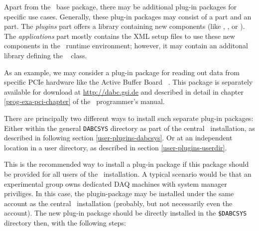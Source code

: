 

Apart from the \dabc\ base package, there may be additional plug-in packages for
specific use cases. Generally, these plug-in packages may consist of a
 part and an  part.
The {\em plugins} part offers a library
containing new components (like , 
, or ). The {\em applications} part
mostly contains the XML setup files to use these new components in the
\dabc\ runtime environment; however, it 
may contain an additonal library defining the \dabc\ 
class.

As an example, we may consider a plug-in package for reading out data
from specific PCIe hardware like the Active Buffer Board \ABB\ \cite{AbbDescription}.
This package is separately available for download at \hyperref{http://dabc.gsi.de}{}{}{http://dabc.gsi.de}
and described in detail in chapter \ref{prog-exa-pci-chapter} of the \dabc\ programmer's manual.

There are principally two different ways to install such separate plug-in packages:
Either within the general {\tt DABCSYS} directory as part of the central \dabc\ installation, as
described in following section \ref{user-plugins-dabcsys}. Or at an independent location
in a user directory, as described in section \ref{user-plugins-userdir}.


This is the recommended way to install a plug-in package if this package should be provided
for all users of the \dabc\ installation. A typical scenario would be that an
experimental group owns dedicated DAQ machines with system manager priviliges.
In this case, the plugin-package may be installed under the same account as the
central \dabc\ installation (probably, but not necessarily even the  account).
The new plug-in package should be directly installed in the {\tt \$DABCSYS} directory
then, with the following steps:

